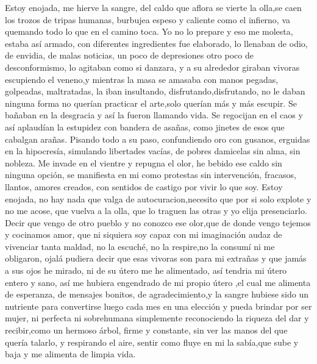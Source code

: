\documentclass[12pt, a4paper, twoside]{book} %
\begin{document}
Estoy enojada, me hierve la sangre, del caldo que aflora se vierte la olla,se caen los trozos de tripas humanas, burbujea espeso y caliente como el infierno, va quemando todo lo que en el camino toca.
Yo no lo prepare y eso me molesta, estaba así armado, con diferentes ingredientes fue elaborado, lo llenaban de odio, de envidia, de malas noticias, un poco de depresiones otro poco de desconformismo, lo agitaban como si danzara, y a su alrededor giraban vivoras escupiendo el veneno,y mientras la masa se amasaba con manos pegadas, golpeadas, maltratadas, la iban insultando, disfrutando,disfrutando, no le daban ninguna forma no querían practicar el arte,solo querían más y más escupir.
Se bañaban en la desgracia y así la fueron llamando vida.
Se regocijan en el caos y así aplaudían la estupidez con bandera de asañas, como jinetes de esos que cabalgan arañas. Pisando todo a su paso, confundiendo oro con gusanos, erguidas en la hipocresía, simulando libertades vacías, de pobres damicelas sin alma, sin nobleza.
Me invade en el vientre y repugna el olor, he bebido ese caldo sin ninguna opción, se manifiesta en mi como protestas sin intervención, fracasos, llantos, amores creados, con sentidos de castigo por vivir lo que soy.
Estoy enojada, no hay nada que valga de autocuracion,necesito que por si solo explote y no me acose, que vuelva a la olla, que lo traguen las otras y yo elija presenciarlo.
Decir que vengo de otro pueblo y no conozco ese olor,que de donde vengo tejemos y cocinamos amor, que ni siquiera soy capaz con mi imaginación audaz de vivenciar tanta maldad, no la escuché, no la respire,no la consumí ni me obligaron, ojalá pudiera decir que esas vivoras son para mi extrañas y que jamás a sus ojos he mirado, ni de su útero me he alimentado, así tendria mi útero entero y sano, así me hubiera engendrado de mi propio útero ,el cual me alimenta de esperanza, de mensajes bonitos, de agradecimiento,y la sangre hubiese sido un nutriente para convertirse luego cada mes en una elección y pueda brindar por ser mujer, ni perfecta ni sobrehumana simplemente reconociendo la riqueza del dar y recibir,como un hermoso árbol, firme y constante, sin ver las manos del que quería talarlo, y respirando el aire, sentir como fluye en mi la sabía,que sube y  baja y me alimenta de limpia vida.
\end{document}
